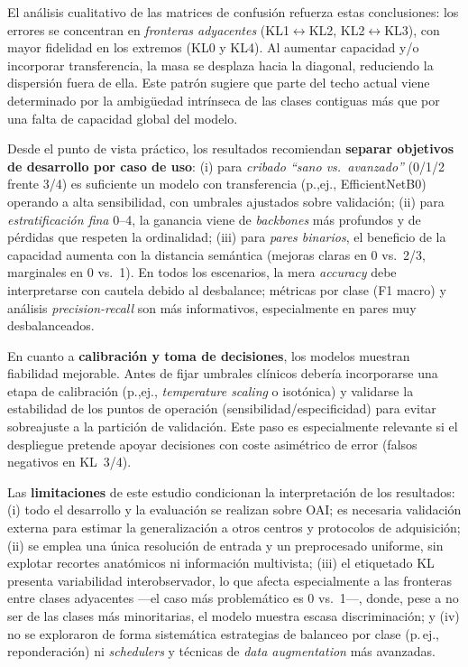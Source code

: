 \documentclass[11pt,spanish,listoffigures,listoftables]{tfgetsinf}
\begin{document}
El análisis cualitativo de las matrices de confusión refuerza estas conclusiones: los errores se concentran en \emph{fronteras adyacentes} (KL1$\leftrightarrow$KL2, KL2$\leftrightarrow$KL3), con mayor fidelidad en los extremos (KL0 y KL4). Al aumentar capacidad y/o incorporar transferencia, la masa se desplaza hacia la diagonal, reduciendo la dispersión fuera de ella. Este patrón sugiere que parte del techo actual viene determinado por la ambigüedad intrínseca de las clases contiguas más que por una falta de capacidad global del modelo.

Desde el punto de vista práctico, los resultados recomiendan \textbf{separar objetivos de desarrollo por caso de uso}: (i) para \emph{cribado “sano vs.\ avanzado”} (0/1/2 frente 3/4) es suficiente un modelo con transferencia (p.,ej., EfficientNetB0) operando a alta sensibilidad, con umbrales ajustados sobre validación; (ii) para \emph{estratificación fina} 0--4, la ganancia viene de \emph{backbones} más profundos y de pérdidas que respeten la ordinalidad; (iii) para \emph{pares binarios}, el beneficio de la capacidad aumenta con la distancia semántica (mejoras claras en 0 vs.\ 2/3, marginales en 0 vs.\ 1). En todos los escenarios, la mera \textit{accuracy} debe interpretarse con cautela debido al desbalance; métricas por clase (F1 macro) y análisis \emph{precision-recall} son más informativos, especialmente en pares muy desbalanceados.

En cuanto a \textbf{calibración y toma de decisiones}, los modelos muestran fiabilidad mejorable. Antes de fijar umbrales clínicos debería incorporarse una etapa de calibración (p.,ej., \emph{temperature scaling} o isotónica) y validarse la estabilidad de los puntos de operación (sensibilidad/especificidad) para evitar sobreajuste a la partición de validación. Este paso es especialmente relevante si el despliegue pretende apoyar decisiones con coste asimétrico de error (falsos negativos en KL~3/4).

Las \textbf{limitaciones} de este estudio condicionan la interpretación de los resultados: (i) todo el desarrollo y la evaluación se realizan sobre OAI; es necesaria validación externa para estimar la generalización a otros centros y protocolos de adquisición; (ii) se emplea una única resolución de entrada y un preprocesado uniforme, sin explotar recortes anatómicos ni información multivista; (iii) el etiquetado KL presenta variabilidad interobservador, lo que afecta especialmente a las fronteras entre clases adyacentes —el caso más problemático es 0 vs.\ 1—, donde, pese a no ser de las clases más minoritarias, el modelo muestra escasa discriminación; y (iv) no se exploraron de forma sistemática estrategias de balanceo por clase (p.\,ej., reponderación) ni \emph{schedulers} y técnicas de \emph{data augmentation} más avanzadas.
\end{document}
